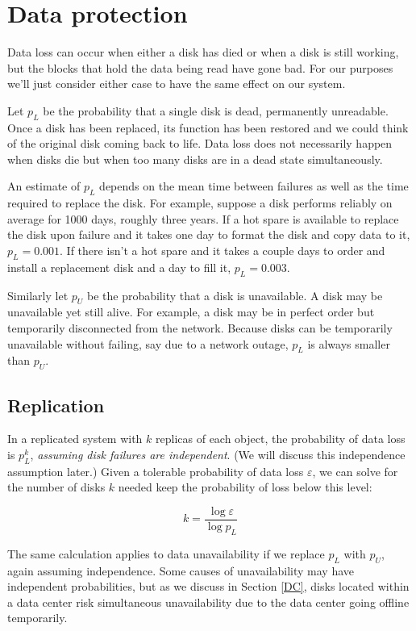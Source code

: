 \section{Data protection}

Data loss can occur when either a disk has died or when a disk is still working, but the blocks that hold the data being read have gone bad. For our purposes we'll just consider either case to have the same effect on our system. 

Let $p_L$ be the probability that a single disk is dead, permanently unreadable. Once a disk has been replaced, its function has been restored and we could think of the original disk coming back to life. Data loss does not necessarily happen when disks die but when too many disks are in a dead state simultaneously.

An estimate of $p_L$ depends on the mean time between failures as well as the time required to replace the disk. For example, suppose a disk performs reliably on average for 1000 days, roughly three years. If a hot spare is available to replace the disk upon failure and it takes one day to format the disk and copy data to it, $p_L = 0.001$. If there isn't a hot spare and it takes a couple days to order and install a replacement disk and a day to fill it, $p_L = 0.003$. 

Similarly let $p_U$ be the probability that a disk is unavailable. A disk may be unavailable yet still alive. For example, a disk may be in perfect order but temporarily disconnected from the network. Because disks can be temporarily unavailable without failing, say due to a network outage, $p_L$ is always smaller than $p_U$.

\subsection{Replication}

In a replicated system with $k$ replicas of each object, the probability of data loss is $p_L^k$, \emph{assuming disk failures are independent}. (We will discuss this independence assumption later.) Given a tolerable probability of data loss $\varepsilon$, we can solve for the number of disks $k$ needed keep the probability of loss below this level:

\begin{equation}
 k = \frac{\log \varepsilon}{\log p_L} \label{kreplication}
\end{equation}

The same calculation applies to data unavailability if we replace $p_L$ with $p_U$, again assuming independence. Some causes of unavailability may have independent probabilities, but as we discuss in Section \ref{DC}, disks located within a data center risk simultaneous unavailability due to the data center going offline temporarily.

